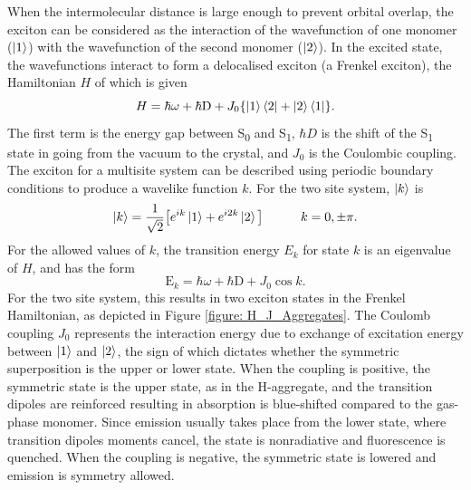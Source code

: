 When the intermolecular distance is large enough to prevent orbital overlap, the exciton can be considered as the interaction of the wavefunction of one monomer ($\ket{1}$) with the wavefunction of the second monomer ($\ket{2}$). In the excited state, the  wavefunctions interact to form a delocalised exciton (a Frenkel exciton), the Hamiltonian $H$ of which is given
\begin{equation}
H=\hbar\omega + \mathrm{\hbar{}D} + J_{0}\{\ket{1}\bra{2}+\ket{2}\bra{1}\}.
\end{equation}
The first term is the energy gap between S\textsubscript{0} and S\textsubscript{1},  $\hbar{}D$ is the shift of the S\textsubscript{1} state in going from the vacuum to the crystal, and $J_{0}$ is the Coulombic coupling.\cite{Spano} The exciton for a multisite system can be described using periodic boundary conditions to produce a wavelike function $k$. For the two site system, $\ket{k}$ is\cite{Hestand2018}
\begin{equation}
\ket{k}=\frac{1}{\sqrt{2}}\big[e^{ik}\ket{1}+  e^{i2k}\ket{2}\big]\qquad\quad k=0,\pm{\pi}.
\end{equation}
For the allowed values of $k$, the transition energy $E_k$ for state $k$ is an eigenvalue of $H$, and has the form
\begin{equation}
\mathrm{E}_{k}=\hbar\omega + \mathrm{\hbar{}D} +J_{0}\cos{k}.
\end{equation}
For the two site system, this results in two exciton states in the Frenkel Hamiltonian, as depicted in Figure \ref{figure: H_J_Aggregates}. The Coulomb coupling $J_{0}$ represents the interaction energy due to exchange of excitation energy between $\ket{1}$ and $\ket{2}$, the sign of which dictates whether the symmetric superposition is the upper or lower state. When the coupling is positive, the symmetric state is the upper state, as in the H-aggregate, and the transition dipoles are reinforced resulting in absorption is blue-shifted compared to the gas-phase monomer. Since emission usually takes place from the lower state, where transition dipoles moments cancel, the state is nonradiative and fluorescence is quenched. When the coupling is negative, the symmetric state is lowered and emission is symmetry allowed.\cite{Hestand2017}

